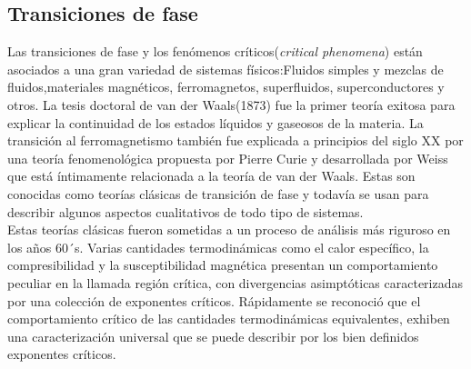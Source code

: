 \documentclass[a4paper]{article}
\begin{document}
\subsection{Transiciones de fase}
Las transiciones de fase y los fenómenos críticos(\textit{critical phenomena}) están asociados a una gran variedad de sistemas físicos:Fluidos simples y mezclas de fluidos,materiales magnéticos, ferromagnetos, superfluidos, superconductores y otros. La tesis doctoral de van der Waals(1873) fue la primer teoría exitosa para explicar la continuidad de los estados líquidos y gaseosos de la materia. La transición al ferromagnetismo también fue explicada a principios del siglo XX por una teoría fenomenológica propuesta por Pierre Curie y desarrollada por Weiss que está íntimamente relacionada a la teoría de van der Waals. Estas son conocidas como teorías clásicas de transición de fase y todavía se usan para describir algunos aspectos cualitativos de todo tipo de sistemas.\\

Estas teorías clásicas fueron sometidas a un proceso de análisis más riguroso en los años 60´s. Varias cantidades termodinámicas como el calor específico, la compresibilidad y la susceptibilidad magnética presentan un comportamiento peculiar en la llamada región crítica, con divergencias asimptóticas caracterizadas por una colección de exponentes críticos. Rápidamente se reconoció que el comportamiento crítico de las cantidades termodinámicas equivalentes, exhiben una caracterización universal que se puede describir por los bien definidos exponentes críticos.  \\
\end{document}
